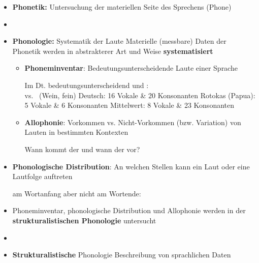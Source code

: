 
\begin{frame}

\begin{itemize}
	\item \textbf{Phonetik:} Untersuchung der materiellen Seite des Sprechens (Phone)
	\item[]
	\item \textbf{Phonologie:} Systematik der Laute \ras Materielle (messbare) Daten der Phonetik werden in abstrakterer Art und Weise \textbf{systematisiert}
	
	\begin{itemize}
		\item \textbf{Phoneminventar}: Bedeutungsunterscheidende Laute einer Sprache 

	\eal		
		\ex Im Dt. bedeutungsunterscheidend \textipa{[v]} und \textipa{[f]}: \\
		\textipa{[v\t{aI}n]} vs.\ \textipa{[f\t{aI}n]} (Wein, fein)
		\ex Deutsch: 16 Vokale \& 20 Konsonanten
		\ex Rotokas (Papua): 5 Vokale \& 6 Konsonanten
		\ex Mittelwert:  8 Vokale \& 23 Konsonanten
	\zl
	
		\item \textbf{Allophonie}: Vorkommen vs. Nicht-Vorkommen (bzw. Variation) von Lauten in bestimmten Kontexten

		\ea Wann kommt der  und wann der  vor?
		\z

	\end{itemize}
	
\end{itemize}
		
\end{frame}




\begin{frame}

\begin{itemize}
	\item \textbf{Phonologische Distribution}: An welchen Stellen kann ein Laut oder eine Lautfolge auftreten

	\ea \textipa{[St\textscr]} am Wortanfang aber nicht am Wortende:\\
	\textipa{[St{\textscr}\t{aU}x]} \vs *
	\z

	\item Phoneminventar, phonologische Distribution und Allophonie werden in der \textbf{strukturalistischen Phonologie} untersucht
	\item[]
	\item \textbf{Strukturalistische} Phonologie \ras Beschreibung von sprachlichen Daten 

\end{itemize}

\end{frame}


